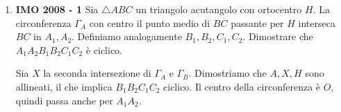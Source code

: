 \begin{enumerate}
    \item \textbf{IMO 2008 - 1} Sia $\triangle ABC$ un triangolo acutangolo con ortocentro $H$. La circonferenza $\Gamma_A$ con centro il punto medio di $BC$ passante per $H$ interseca $BC$ in $A_1,A_2$. Definiamo analogamente $B_1,B_2,C_1,C_2$. Dimostrare che $A_1A_2B_1B_2C_1C_2$ è ciclico.  
    
    \begin{sol}
    Sia $X$ la seconda intersezione di $\Gamma_A$ e $\Gamma_B$. Dimostriamo che $A,X,H$ sono allineati, il che implica $B_1B_2C_1C_2$ ciclico. Il centro della circonferenza è $O$, quindi passa anche per $A_1A_2$.
    \end{sol}
    
\end{enumerate}
